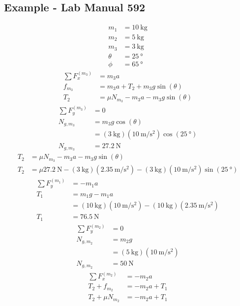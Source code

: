 \documentclass{article}
\begin{document}
\subsection{Example - Lab Manual 592}
\begin{align*}
	m_1 & = \SI{10}{\kilogram} \\
	m_2 & = \SI{5}{\kilogram} \\
	m_3 & = \SI{3}{\kilogram} \\
	\theta & = \SI{25}{\degree} \\
	\phi & = \SI{65}{\degree}
\end{align*}
\begin{align*}
	\sum F_x^{(m_3)} & = m_3a \\
	f_{m_3} & = m_3a + T_2 + m_3g\sin(\theta) \\
	T_2 & = \mu N_{m_3} - m_3a - m_3g\sin(\theta)
\end{align*}
\begin{align*}
	\sum F_y^{(m_3)} & = 0 \\
	N_{g,m_3} & = m_3g\cos(\theta) \\
			  & = (\SI{3}{\kilogram})(\SI{10}{\meter \per \second \squared})\cos(\SI{25}{\degree}) \\
	N_{g,m_3} & = \SI{27.2}{\newton}
\end{align*}
\begin{align*}
	T_2 & = \mu N_{m_3} - m_3a - m_3g\sin(\theta) \\
	T_2 & = \mu \SI{27.2}{\newton} - (\SI{3}{\kilogram})(\SI{2.35}{\meter \per \second \squared}) - (\SI{3}{\kilogram})(\SI{10}{\meter \per \second \squared})\sin(\SI{25}{\degree})
\end{align*}
\begin{align*}
	\sum F_y^{(m_1)} & = -m_1a \\
	T_1 & = m_1g - m_1a \\
		& = (\SI{10}{\kilogram})(\SI{10}{\meter \per \second \squared}) - (\SI{10}{\kilogram})(\SI{2.35}{\meter \per \second \squared}) \\
	T_1 & = \SI{76.5}{\newton}
\end{align*}
\begin{align*}
	\sum F_y^{(m_2)} & = 0 \\
	N_{g,m_2} & = m_2g \\
			  & = (\SI{5}{\kilogram})(\SI{10}{\meter \per \second \squared}) \\
	N_{g,m_2} & = \SI{50}{\newton}
\end{align*}
\begin{align*}
	\sum F_x^{(m_2)} & = -m_2a \\
	T_2 + f_{m_2} & = -m_2a + T_1 \\
	T_2 + \mu N_{m_2} & = -m_2a + T_1 \\
\end{align*}
\end{document}

